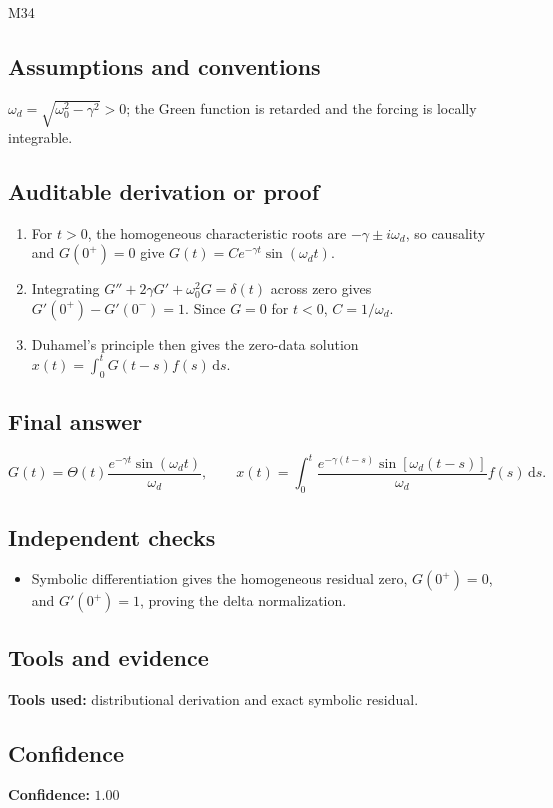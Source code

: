 \documentclass[11pt]{article}
\newcommand{\dd}{\mathrm{d}}
\begin{document}
\begin{mprsolution}{M34}
\subsection*{Assumptions and conventions}
\(\omega_d=\sqrt{\omega_0^2-\gamma^2}>0\); the Green function is retarded and
the forcing is locally integrable.
\subsection*{Auditable derivation or proof}
\begin{enumerate}[label=\textbf{Step \arabic*:},leftmargin=*]
\item For \(t>0\), the homogeneous characteristic roots are
\(-\gamma\pm i\omega_d\), so causality and \(G(0^+)=0\) give
\(G(t)=C e^{-\gamma t}\sin(\omega_dt)\).
\item Integrating \(G''+2\gamma G'+\omega_0^2G=\delta(t)\) across zero gives
\(G'(0^+)-G'(0^-)=1\).  Since \(G=0\) for \(t<0\), \(C=1/\omega_d\).
\item Duhamel's principle then gives the zero-data solution
\(x(t)=\int_0^tG(t-s)f(s)\,\dd s\).
\end{enumerate}
\subsection*{Final answer}
\[
\boxed{\displaystyle
G(t)=\Theta(t)\frac{e^{-\gamma t}\sin(\omega_dt)}{\omega_d},\qquad
x(t)=\int_0^t\frac{e^{-\gamma(t-s)}\sin[\omega_d(t-s)]}{\omega_d}f(s)\,\dd s.}
\]
\subsection*{Independent checks}
\begin{itemize}[leftmargin=*]
\item Symbolic differentiation gives the homogeneous residual zero,
\(G(0^+)=0\), and \(G'(0^+)=1\), proving the delta normalization.
\end{itemize}
\subsection*{Tools and evidence}
\textbf{Tools used:} distributional derivation and exact symbolic residual.
\subsection*{Confidence}
\textbf{Confidence:} \(1.00\)
\end{mprsolution}
\end{document}
